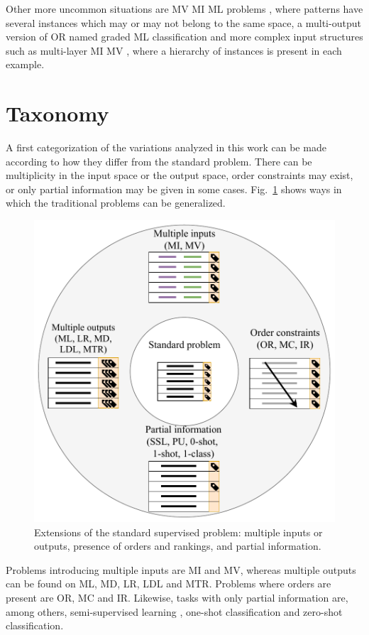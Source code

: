 \documentclass[
	fontsize=11pt, %
	twoside=false, %
	open=any, %
	secnumdepth=1, %
]{kaobook}
\begin{document}
Other more uncommon situations are MV MI ML problems \cite{mvmiml}, where patterns have several instances which may or may not belong to the same space, a multi-output version of OR named graded ML classification \cite{graded-ml} and more complex input structures such as multi-layer MI MV \cite{mlmimv}, where a hierarchy of instances is present in each example. 

\section{Taxonomy}
\label{sec:taxonomy}

A first categorization of the variations analyzed in this work can be made according to how they differ from the standard problem. There can be multiplicity in the input space or the output space, order constraints may exist, or only partial information may be given in some cases. Fig.~\ref{fig.multiples} shows ways in which the traditional problems can be generalized. 

\begin{figure}[ht]
\centering
\includegraphics[width=.65\textwidth]{problems2}
\caption{\label{fig.multiples}Extensions of the standard supervised problem: multiple inputs or outputs, presence of orders and rankings, and partial information.}
\end{figure}

Problems introducing multiple inputs are MI and MV, whereas multiple outputs can be found on ML, MD, LR, LDL and MTR. Problems where orders are present are OR, MC and IR. Likewise, tasks with only partial information are, among others, semi-supervised learning , one-shot classification and zero-shot classification.
\end{document}
